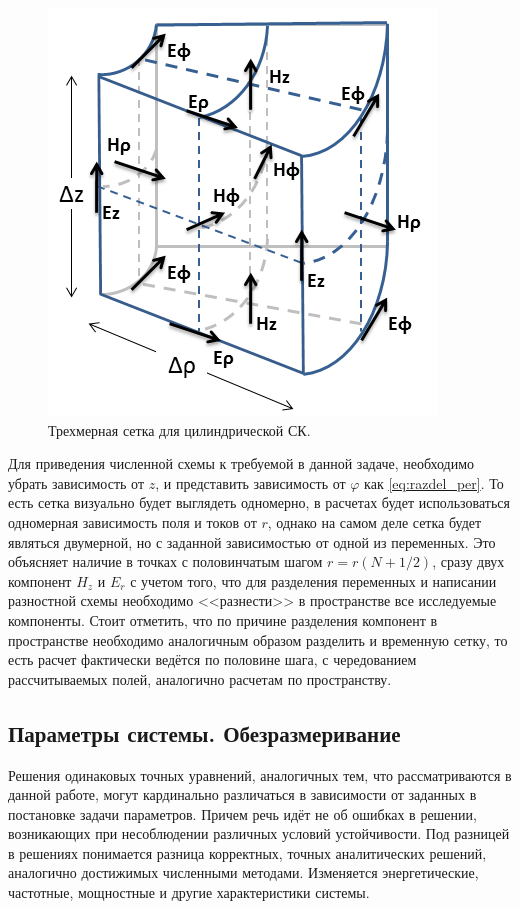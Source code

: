 \documentclass[a4paper]{article}
\begin{document}
\begin{figure}[H]\centering	
	\includegraphics[width=0.5\linewidth]{pics/FDTD_cill}
	\caption{Трехмерная сетка для цилиндрической СК.}
	\label{fig:fdtd_3d}
\end{figure}

Для приведения численной схемы к требуемой в данной задаче, необходимо убрать зависимость от $z$, и представить зависимость от $\varphi$ как \eqref{eq:razdel_per}. То есть сетка визуально будет выглядеть одномерно, в расчетах будет использоваться одномерная зависимость поля и токов от $r$, однако на самом деле сетка будет являться двумерной, но с заданной зависимостью от одной из переменных. Это объясняет наличие в точках с половинчатым шагом $r=r\left(N+1/2\right)$, сразу двух компонент $H_{z}$ и $E_{r}$ с учетом того, что для разделения переменных и написании разностной схемы необходимо <<разнести>> в пространстве все исследуемые компоненты. Стоит отметить, что по причине разделения компонент в пространстве необходимо аналогичным образом разделить и временную сетку, то есть расчет фактически ведётся по половине шага, с чередованием рассчитываемых полей, аналогично расчетам по пространству.
\begin{figure}[H]\centering
	
	\label{fig^fdtd_1d}
\end{figure}

\subsection{Параметры системы. Обезразмеривание}

Решения одинаковых точных уравнений, аналогичных тем, что рассматриваются в данной работе, могут кардинально различаться в зависимости от заданных в постановке задачи параметров. Причем речь идёт не об ошибках в решении, возникающих при несоблюдении различных условий устойчивости. Под разницей в  решениях понимается разница корректных, точных аналитических решений, аналогично достижимых численными методами. Изменяется энергетические, частотные, мощностные и другие характеристики системы.
\end{document}
